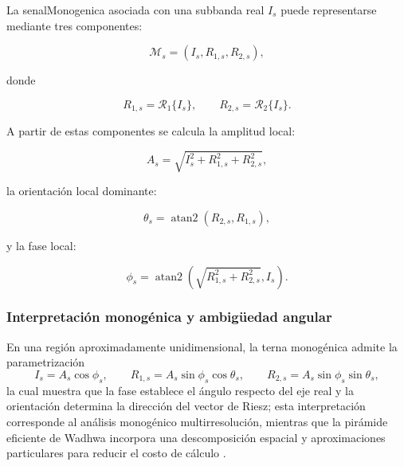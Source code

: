 La \gls{senalMonogenica} asociada con una subbanda real $I_s$ puede representarse mediante tres componentes:

\begin{equation}
    \mathcal{M}_s
    =
    \left(
        I_s,
        R_{1,s},
        R_{2,s}
    \right),
    \label{eq:senal_monogenica}
\end{equation}

donde

\begin{equation}
    R_{1,s}=\mathcal{R}_1\{I_s\},
    \qquad
    R_{2,s}=\mathcal{R}_2\{I_s\}.
\end{equation}

A partir de estas componentes se calcula la amplitud local:

\begin{equation}
    A_s
    =
    \sqrt{
        I_s^2
        +
        R_{1,s}^2
        +
        R_{2,s}^2
    },
    \label{eq:amplitud_riesz}
\end{equation}

la orientación local dominante:

\begin{equation}
    \theta_s
    =
    \operatorname{atan2}
    \left(
        R_{2,s},
        R_{1,s}
    \right),
    \label{eq:orientacion_riesz}
\end{equation}

y la fase local:

\begin{equation}
    \phi_s
    =
    \operatorname{atan2}
    \left(
        \sqrt{
            R_{1,s}^2+R_{2,s}^2
        },
        I_s
    \right).
    \label{eq:fase_riesz}
\end{equation}

\subsubsection{Interpretación monogénica y ambigüedad angular}

En una región aproximadamente unidimensional, la terna monogénica admite la parametrización
\begin{equation}
 I_s=A_s\cos\phi_s,\qquad
 R_{1,s}=A_s\sin\phi_s\cos\theta_s,\qquad
 R_{2,s}=A_s\sin\phi_s\sin\theta_s,
 \label{eq:piramides_parametrizacion_monogenica}
\end{equation}
la cual muestra que la fase establece el ángulo respecto del eje real y la orientación determina la dirección del vector de Riesz; esta interpretación corresponde al análisis monogénico multirresolución, mientras que la pirámide eficiente de Wadhwa incorpora una descomposición espacial y aproximaciones particulares para reducir el costo de cálculo \cite{unser2009monogenic,wadhwa2014riesz}.

